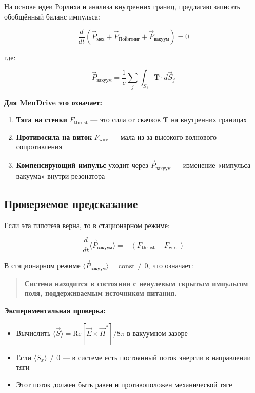 \documentclass[a4paper,12pt]{article}
\begin{document}
{На основе идеи Рорлиха и анализа внутренних границ, предлагаю записать
обобщённый баланс импульса:

\begin{equation}
\boxed{
\frac{d}{dt} \left( \vec{P}_{\text{мех}} + \vec{P}_{\text{Пойнтинг}} +
\vec{P}_{\text{вакуум}} \right) = 0
}
\label{eq:generalized_momentum}
\end{equation}

где:

\begin{equation}
\vec{P}_{\text{вакуум}} = \frac{1}{c} \sum_{j} \int_{S_j} \mathbf{T} \cdot
d\vec{S}_j
\label{eq:vacuum_momentum}
\end{equation}

\textbf{Для MenDrive это означает:}

\begin{enumerate}
    \item \textbf{Тяга на стенки} $F_{\text{thrust}}$ --- это сила от скачков
    $\mathbf{T}$ на внутренних границах
    \item \textbf{Противосила на виток} $F_{\text{wire}}$ --- мала из-за высокого
    волнового сопротивления
    \item \textbf{Компенсирующий импульс} уходит через $\vec{P}_{\text{вакуум}}$ ---
    изменение «импульса вакуума» внутри резонатора
\end{enumerate}

\subsection{Проверяемое предсказание}

Если эта гипотеза верна, то в стационарном режиме:

\begin{equation}
\frac{d}{dt} \langle \vec{P}_{\text{вакуум}} \rangle = - (F_{\text{thrust}} +
F_{\text{wire}})
\label{eq:testable_prediction}
\end{equation}

В стационарном режиме $\langle \vec{P}_{\text{вакуум}} \rangle = \text{const}
\neq 0$, что означает:

\begin{quote}
\textbf{Система находится в состоянии с ненулевым скрытым импульсом поля,
поддерживаемым источником питания.}
\end{quote}

\textbf{Экспериментальная проверка:}
\begin{itemize}
    \item Вычислить $\langle \vec{S} \rangle = \text{Re}[\vec{E} \times
    \vec{H}^*]/8\pi$ в вакуумном зазоре
    \item Если $\langle S_x \rangle \neq 0$ --- в системе есть постоянный поток
    энергии в направлении тяги
    \item Этот поток должен быть равен и противоположен механической тяге
\end{itemize}

}
\end{document}
